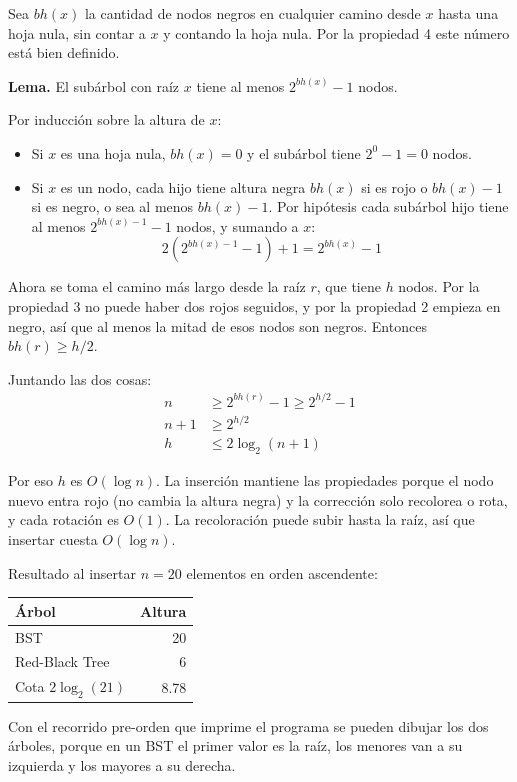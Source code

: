 \documentclass[11pt]{article}
\begin{document}
Sea $bh(x)$ la cantidad de nodos negros en cualquier camino desde $x$ hasta una hoja nula, sin contar a $x$ y contando la hoja nula. Por la propiedad 4 este número está bien definido.

\textbf{Lema.} El subárbol con raíz $x$ tiene al menos $2^{bh(x)} - 1$ nodos.

Por inducción sobre la altura de $x$:

\begin{itemize}
\item Si $x$ es una hoja nula, $bh(x) = 0$ y el subárbol tiene $2^0 - 1 = 0$ nodos.
\item Si $x$ es un nodo, cada hijo tiene altura negra $bh(x)$ si es rojo o $bh(x) - 1$ si es negro, o sea al menos $bh(x) - 1$. Por hipótesis cada subárbol hijo tiene al menos $2^{bh(x) - 1} - 1$ nodos, y sumando a $x$:
\[
2\left(2^{bh(x) - 1} - 1\right) + 1 = 2^{bh(x)} - 1
\]
\end{itemize}

Ahora se toma el camino más largo desde la raíz $r$, que tiene $h$ nodos. Por la propiedad 3 no puede haber dos rojos seguidos, y por la propiedad 2 empieza en negro, así que al menos la mitad de esos nodos son negros. Entonces $bh(r) \ge h/2$.

Juntando las dos cosas:
\begin{align*}
n &\ge 2^{bh(r)} - 1 \ge 2^{h/2} - 1 \\
n + 1 &\ge 2^{h/2} \\
h &\le 2\log_2(n + 1)
\end{align*}

Por eso $h$ es $O(\log n)$. La inserción mantiene las propiedades porque el nodo nuevo entra rojo (no cambia la altura negra) y la corrección solo recolorea o rota, y cada rotación es $O(1)$. La recoloración puede subir hasta la raíz, así que insertar cuesta $O(\log n)$.

Resultado al insertar $n = 20$ elementos en orden ascendente:

\begin{center}
\begin{tabular}{lr}
\hline
Árbol & Altura \\
\hline
BST & 20 \\
Red-Black Tree & 6 \\
Cota $2\log_2(21)$ & 8.78 \\
\hline
\end{tabular}
\end{center}

Con el recorrido pre-orden que imprime el programa se pueden dibujar los dos árboles, porque en un BST el primer valor es la raíz, los menores van a su izquierda y los mayores a su derecha.
\end{document}
